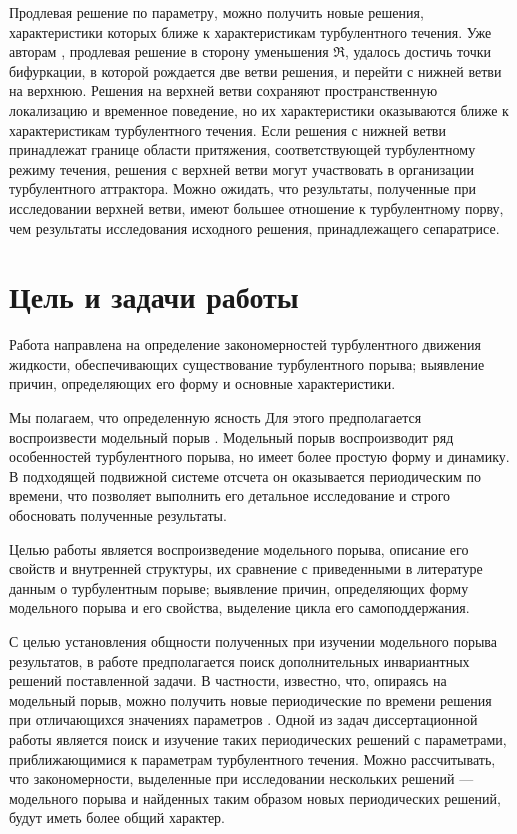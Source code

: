 Продлевая решение \cite{Avila2013} по параметру, можно получить новые решения, характеристики которых ближе к характеристикам турбулентного течения. Уже авторам \cite{Avila2013}, продлевая решение в сторону уменьшения $\Re$, удалось достичь точки бифуркации, в которой рождается две ветви решения, и перейти с нижней ветви на верхнюю. Решения на верхней ветви сохраняют пространственную локализацию и временное поведение, но их характеристики оказываются ближе к характеристикам турбулентного течения. Если решения с нижней ветви принадлежат границе области притяжения, соответствующей турбулентному режиму течения, решения с верхней ветви могут участвовать в организации турбулентного аттрактора. Можно ожидать, что результаты, полученные при исследовании верхней ветви, имеют большее отношение к турбулентному порву, чем результаты исследования исходного решения, принадлежащего сепаратрисе. 


\section{Цель и задачи работы}

Работа направлена на определение закономерностей турбулентного движения жидкости, обеспечивающих существование турбулентного порыва; выявление причин, определяющих его форму и основные характеристики. 

Мы полагаем, что определенную ясность 
Для этого предполагается воспроизвести модельный порыв \cite{Avila2013}. Модельный порыв воспроизводит ряд особенностей турбулентного порыва, но имеет более простую форму и динамику. В подходящей подвижной системе отсчета он оказывается периодическим по времени, что позволяет выполнить его детальное исследование и строго обосновать полученные результаты.

Целью работы является воспроизведение модельного порыва, описание его свойств и внутренней структуры, их сравнение с приведенными в литературе данным о турбулентным порыве; выявление причин, определяющих форму модельного порыва и его свойства, выделение цикла его самоподдержания. 

С целью установления общности полученных при изучении модельного порыва результатов, в работе предполагается поиск дополнительных инвариантных решений поставленной задачи. В частности, известно, что, опираясь на модельный порыв, можно получить новые периодические по времени решения при отличающихся значениях параметров \cite{Viswanath2007, Dijkstra2014}. Одной из задач диссертационной работы является поиск и изучение таких периодических решений с параметрами, приближающимися к параметрам турбулентного течения. Можно рассчитывать, что закономерности, выделенные при исследовании нескольких решений --- модельного порыва и найденных таким образом новых периодических решений, будут иметь более общий характер. 

